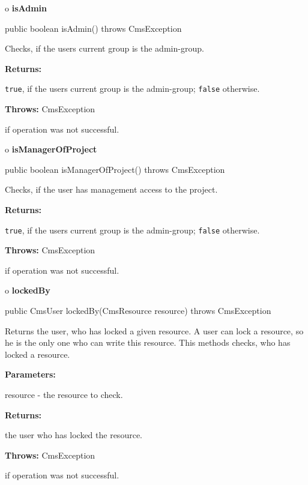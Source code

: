 o {\bf isAdmin}

\begin{PRE}
 public boolean isAdmin() throws CmsException
\end{PRE}

\begin{description}
\htmlDD Checks, if the users current group is the admin-group.

\begin{description}
\item {\bf Returns:}

{\tt true}, if the users current group is the admin-group; {\tt false}
otherwise.
\item {\bf Throws:} CmsException

if operation was not successful.
\end{description}

\end{description}

o {\bf isManagerOfProject}

\begin{PRE}
 public boolean isManagerOfProject() throws CmsException
\end{PRE}

\begin{description}
\htmlDD Checks, if the user has management access to the project.

\begin{description}
\item {\bf Returns:}

{\tt true}, if the users current group is the admin-group; {\tt false}
otherwise.
\item {\bf Throws:} CmsException

if operation was not successful.
\end{description}

\end{description}

o {\bf lockedBy}

\begin{PRE}
 public CmsUser lockedBy(CmsResource resource) throws CmsException
\end{PRE}

\begin{description}
\htmlDD Returns the user, who has locked a given resource. \htmlBR
A user can lock a resource, so he is the only one who can write this resource.
This methods checks, who has locked a resource.

\begin{description}
\item {\bf Parameters:}

resource - the resource to check.
\item {\bf Returns:}

the user who has locked the resource.
\item {\bf Throws:} CmsException

if operation was not successful.
\end{description}

\end{description}

